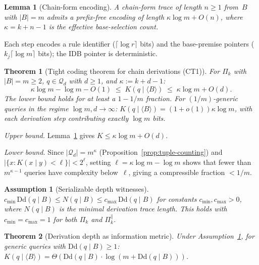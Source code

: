 \documentclass[journal]{IEEEtran}
\makeatletter
\newcommand{\Dd}{\text{Dd}}
\newtheorem{assumption}{Assumption}[section]
\newtheorem{theorem}{Theorem}[section]
\newtheorem{lemma}{Lemma}[section]
\numberwithin{equation}{section}
\renewenvironment{proof}[1][\proofname]{\par
  \pushQED{\qed}%
  \normalfont \topsep6\p@\@plus6\p@\relax
  \trivlist
  \item[\hskip\labelsep
        \itshape
    #1\@addpunct{.}]\ignorespaces
}{%
  \popQED\endtrivlist\@endpefalse
}
\makeatother
\begin{document}
\begin{lemma}[Chain-form encoding]
\label{lem:chain-encoding}
A chain-form trace of length $n\ge 1$ from~$B$ with
$|B|=m$ admits a prefix-free encoding of length
$\kappa\log m+O(n)$,
where $\kappa=k{+}n{-}1$ is the effective base-selection
count.
\end{lemma}

\begin{proof}
Each step encodes a rule identifier
($\lceil\log r\rceil$ bits) and the base-premise pointers
($k_j\lceil\log m\rceil$ bits); the IDB pointer is
deterministic.
\end{proof}

\begin{theorem}[Tight coding theorem for chain derivations
  \textup{(CT1)}]
\label{thm:tight-datalog}
For $\Pi_k$ with $|B|=m\ge 2$, $q\in\mathcal{Q}_d$ with
$d\ge 1$, and $\kappa:=k{+}d{-}1$:
\begin{equation}\label{eq:tight-datalog-bounds}
  \kappa\log m-\log m-O(1)
  \;\le\;K(q\mid\langle B\rangle)
  \;\le\;\kappa\log m+O(d).
\end{equation}
The lower bound holds for at least a $1{-}1/m$ fraction.
For $(1/m)$-generic queries in the regime
$\log m,d\to\infty$:
$K(q\mid\langle B\rangle)=(1{+}o(1))\kappa\log m$,
with each derivation step contributing exactly $\log m$
bits.
\end{theorem}

\begin{proof}
\emph{Upper bound.}\;
Lemma~\ref{lem:chain-encoding} gives
$K\le\kappa\log m+O(d)$.

\emph{Lower bound.}\;
Since $|\mathcal{Q}_d|=m^{\kappa}$
(Proposition~\ref{prop:tuple-counting}) and
$|\{x:K(x\mid y)<\ell\}|<2^\ell$, setting
$\ell=\kappa\log m-\log m$ shows that fewer than
$m^{\kappa-1}$ queries have complexity below~$\ell$,
giving a compressible fraction $<1/m$.
\end{proof}

\begin{assumption}[Serializable depth witnesses]
\label{assump:serializable}
$c_{\min}\,\Dd(q\mid B)\le N(q\mid B)
\le c_{\max}\,\Dd(q\mid B)$
for constants $c_{\min},c_{\max}>0$, where $N(q\mid B)$ is
the minimal derivation trace length.
This holds with $c_{\min}=c_{\max}=1$ for both $\Pi_k$ and
$\Pi_k^{\parallel}$.
\end{assumption}

\begin{theorem}[Derivation depth as information metric]
\label{thm:derivation-depth-info-metric}
Under Assumption~\textup{\ref{assump:serializable}}, for
generic queries with $\Dd(q\mid B)\ge 1$:
$K(q\mid\langle B\rangle)
=\Theta(\Dd(q\mid B)\cdot\log(m{+}\Dd(q\mid B)))$.
\end{theorem}
\end{document}
